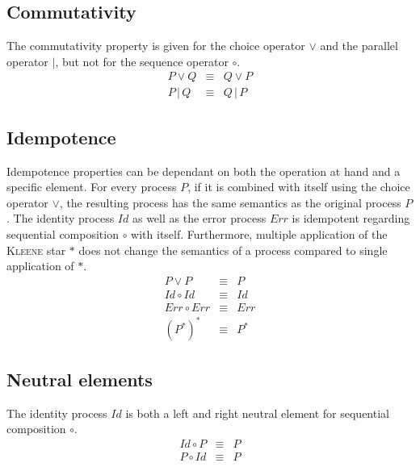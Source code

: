 \subsection{Commutativity}
The commutativity property is given for the choice operator $\vee$ and the parallel operator $|$, but not for the sequence operator $\circ$.
\begin{eqnarray*}
  P \vee Q & \equiv & Q \vee P \\
  P \,|\, Q & \equiv & Q \,|\, P
\end{eqnarray*}

\subsection{Idempotence}
Idempotence properties can be dependant on both the operation at hand and a specific element. For every process $P$, if it is combined with itself using the choice operator $\vee$, the resulting process has the same semantics as the original process $P$. The identity process $Id$ as well as the error process $Err$ is idempotent regarding sequential composition $\circ$ with itself. Furthermore, multiple application of the \textsc{Kleene} star $*$ does not change the semantics of a process compared to single application of $*$.
\begin{eqnarray*}
  P \vee P & \equiv & P \\
  Id \circ Id & \equiv & Id \\
  Err \circ Err & \equiv & Err \\
  (P^*)^* & \equiv & P^*
\end{eqnarray*}

\subsection{Neutral elements}
The identity process $Id$ is both a left and right neutral element for sequential composition $\circ$.
\begin{eqnarray*}
  Id \circ P & \equiv & P \\
  P \circ Id & \equiv & P
\end{eqnarray*}